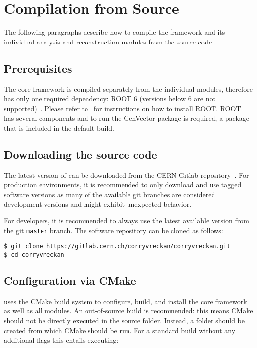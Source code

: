 \section{Compilation from Source}

The following paragraphs describe how to compile the \corry framework and its individual analysis and reconstruction modules from the source code.

\subsection{Prerequisites}
\label{sec:prerequisites}
The core framework is compiled separately from the individual modules, therefore \corry has only one required dependency: ROOT 6 (versions below 6 are not supported)~\cite{root}.
Please refer to~\cite{rootinstallation} for instructions on how to install ROOT.
ROOT has several components and to run \corry the GenVector package is required, a package that is included in the default build.

\subsection{Downloading the source code}
The latest version of \corry can be downloaded from the CERN Gitlab repository~\cite{corry-repo}.
For production environments, it is recommended to only download and use tagged software versions as many of the available git branches are considered development versions and might exhibit unexpected behavior.

For developers, it is recommended to always use the latest available version from the git \texttt{master} branch.
The software repository can be cloned as follows:

\begin{verbatim}
$ git clone https://gitlab.cern.ch/corryvreckan/corryvreckan.git
$ cd corryvreckan
\end{verbatim}

\subsection{Configuration via CMake}
\label{sec:cmake_config}
\corry uses the CMake build system to configure, build, and install the core framework as well as all modules.
An out-of-source build is recommended: this means CMake should not be directly executed in the source folder.
Instead, a  folder should be created from which CMake should be run.
For a standard build without any additional flags this entails executing:

